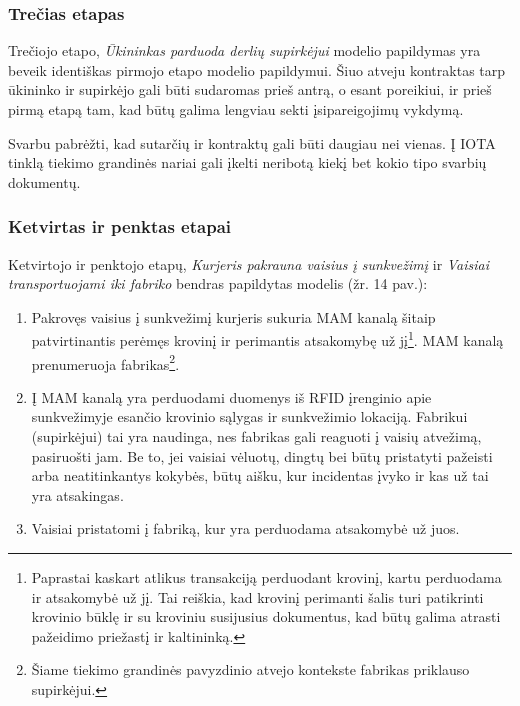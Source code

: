 
\subsubsection{Trečias etapas}

Trečiojo etapo, \textit{Ūkininkas parduoda derlių supirkėjui} modelio papildymas yra beveik identiškas pirmojo etapo modelio papildymui. Šiuo atveju kontraktas tarp ūkininko ir supirkėjo gali būti sudaromas prieš antrą, o esant poreikiui, ir prieš pirmą etapą tam, kad būtų galima lengviau sekti įsipareigojimų vykdymą.

Svarbu pabrėžti, kad sutarčių ir kontraktų gali būti daugiau nei vienas. Į IOTA tinklą tiekimo grandinės nariai gali įkelti neribotą kiekį bet kokio tipo svarbių dokumentų.




\subsubsection{Ketvirtas ir penktas etapai}

Ketvirtojo ir penktojo etapų, \textit{Kurjeris pakrauna vaisius į sunkvežimį} ir \textit{Vaisiai transportuojami iki fabriko} bendras papildytas modelis (žr. 14 pav.):
\begin{enumerate}
    \item Pakrovęs vaisius į sunkvežimį kurjeris sukuria MAM kanalą šitaip patvirtinantis perėmęs krovinį ir perimantis atsakomybę už jį\footnote{Paprastai kaskart atlikus transakciją perduodant krovinį, kartu perduodama ir atsakomybė už jį. Tai reiškia, kad krovinį perimanti šalis turi patikrinti krovinio būklę ir su kroviniu susijusius dokumentus, kad būtų galima atrasti pažeidimo priežastį ir kaltininką.}. MAM kanalą prenumeruoja fabrikas\footnote{Šiame tiekimo grandinės pavyzdinio atvejo kontekste fabrikas priklauso supirkėjui.}.
    \item Į MAM kanalą yra perduodami duomenys iš RFID įrenginio apie sunkvežimyje esančio krovinio sąlygas ir sunkvežimio lokaciją. Fabrikui (supirkėjui) tai yra naudinga, nes fabrikas gali reaguoti į vaisių atvežimą, pasiruošti jam. Be to, jei vaisiai vėluotų, dingtų bei būtų pristatyti pažeisti arba neatitinkantys kokybės, būtų aišku, kur incidentas įvyko ir kas už tai yra atsakingas.
    \item Vaisiai pristatomi į fabriką, kur yra perduodama atsakomybė už juos.
\end{enumerate}


